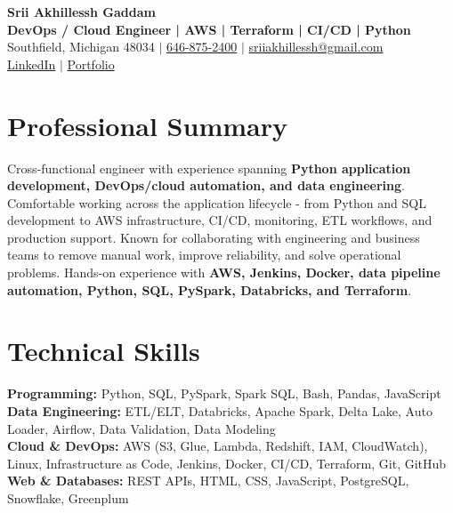 \documentclass[letterpaper,10pt]{article}
\begin{document}
\fontsize{9.35pt}{10.45pt}\selectfont

\begin{center}
    {\LARGE \textbf{Srii Akhillessh Gaddam}} \\[-1pt]
    \textbf{DevOps / Cloud Engineer | AWS | Terraform | CI/CD | Python} \\[2pt]
    Southfield, Michigan 48034 $|$
    \href{tel:6468752400}{646-875-2400} $|$
    \href{mailto:sriiakhillessh@gmail.com}{sriiakhillessh@gmail.com} \\[1pt]
    \href{https://www.linkedin.com/in/srii-akhiilessh-gaddam-b48668191/}{LinkedIn} $|$
    \href{https://sriiakhillesshg.github.io/portfolio/}{Portfolio}
\end{center}
\vspace{-8pt}

\section{Professional Summary}
\small{Cross-functional engineer with experience spanning \textbf{Python application development, DevOps/cloud automation, and data engineering}. Comfortable working across the application lifecycle - from Python and SQL development to AWS infrastructure, CI/CD, monitoring, ETL workflows, and production support. Known for collaborating with engineering and business teams to remove manual work, improve reliability, and solve operational problems. Hands-on experience with \textbf{AWS, Jenkins, Docker, data pipeline automation, Python, SQL, PySpark, Databricks, and Terraform}.}

\section{Technical Skills}
\small{
\textbf{Programming:} Python, SQL, PySpark, Spark SQL, Bash, Pandas, JavaScript \\
\textbf{Data Engineering:} ETL/ELT, Databricks, Apache Spark, Delta Lake, Auto Loader, Airflow, Data Validation, Data Modeling \\
\textbf{Cloud \& DevOps:} AWS (S3, Glue, Lambda, Redshift, IAM, CloudWatch), Linux, Infrastructure as Code, Jenkins, Docker, CI/CD, Terraform, Git, GitHub \\
\textbf{Web \& Databases:} REST APIs, HTML, CSS, JavaScript, PostgreSQL, Snowflake, Greenplum
}
\end{document}
